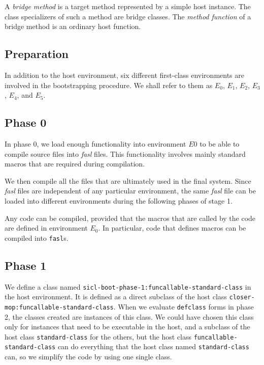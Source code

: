 \begin{definition}
A \emph{bridge method} is a target method represented by a simple host
instance.  The class specializers of such a method are bridge classes.
The \emph{method function} of a bridge method is an ordinary host
function.
\end{definition}

\subsection{Preparation}

In addition to the host environment, six different \sysname{}
first-class environments are involved in the bootstrapping procedure.
We shall refer to them as $E_0$, $E_1$, $E_2$, $E_3$, $E_4$, and $E_5$.

\subsection{Phase 0}

In phase $0$, we load enough functionality into environment $E0$ to be
able to compile source files into \emph{fasl} files.  This
functionality involves mainly standard macros that are required during
compilation.

We then compile all the files that are ultimately used in the final
system.  Since \emph{fasl} files are independent of any particular
environment, the same \emph{fasl} file can be loaded into different
environments during the following phases of stage 1.

Any code can be compiled, provided that the macros that are called by
the code are defined in environment $E_0$.  In particular, code that
defines macros can be compiled into \texttt{fasl}s.

\subsection{Phase 1}

We define a class named
\texttt{sicl-boot-phase-1:funcallable-standard-class} in the host
environment.  It is defined as a direct subclass of the host class
\texttt{closer-mop:funcallable-standard-class}.  When we
evaluate \texttt{defclass} forms in phase 2, the classes created are
instances of this class.  We could have chosen this class only for
instances that need to be executable in the host, and a subclass of
the host class \texttt{standard-class} for the others, but the host
class \texttt{funcallable-standard-class} can do everything that the
host class named \texttt{standard-class} can, so we simplify the code by
using one single class.

